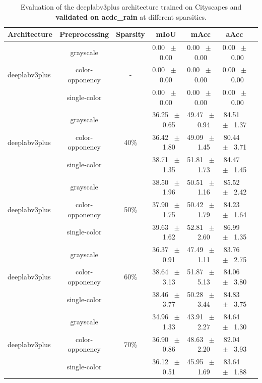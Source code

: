 \begin{table}[h]
  \centering
  \caption{Evaluation of the deeplabv3plus architecture trained on Cityscapes and \textbf{validated on acdc_rain} at different sparsities.}
  \begin{tabular}{@{}lccc ccc@{}}
    \toprule
    Architecture & Preprocessing & Sparsity & mIoU & mAcc & aAcc \\
    \midrule
    \midrule
    \midrule
    \multirow{3}{*}{deeplabv3plus} & grayscale & \multirow{3}{*}{-} & 0.00 ~$\pm$~ 0.00 & 0.00 ~$\pm$~ 0.00 & 0.00 ~$\pm$~ 0.00 \\
    & color-opponency & & 0.00 ~$\pm$~ 0.00 & 0.00 ~$\pm$~ 0.00 & 0.00 ~$\pm$~ 0.00 \\
    & single-color & & 0.00 ~$\pm$~ 0.00 & 0.00 ~$\pm$~ 0.00 & 0.00 ~$\pm$~ 0.00 \\
    \midrule
    \multirow{3}{*}{deeplabv3plus} & grayscale & \multirow{3}{*}{40\%} & 36.25 ~$\pm$~ 0.65 & 49.47 ~$\pm$~ 0.94 & 84.51 ~$\pm$~ 1.37 \\
    & color-opponency & & 36.42 ~$\pm$~ 1.80 & 49.09 ~$\pm$~ 1.45 & 80.44 ~$\pm$~ 3.71 \\
    & single-color & & 38.71 ~$\pm$~ 1.35 & 51.81 ~$\pm$~ 1.73 & 84.47 ~$\pm$~ 1.45 \\
    \midrule
    \multirow{3}{*}{deeplabv3plus} & grayscale & \multirow{3}{*}{50\%} & 38.50 ~$\pm$~ 1.96 & 50.51 ~$\pm$~ 1.16 & 85.52 ~$\pm$~ 2.42 \\
    & color-opponency & & 37.90 ~$\pm$~ 1.75 & 50.42 ~$\pm$~ 1.79 & 84.23 ~$\pm$~ 1.64 \\
    & single-color & & 39.63 ~$\pm$~ 1.62 & 52.81 ~$\pm$~ 2.60 & 86.99 ~$\pm$~ 1.35 \\
    \midrule
    \multirow{3}{*}{deeplabv3plus} & grayscale & \multirow{3}{*}{60\%} & 36.37 ~$\pm$~ 0.91 & 47.49 ~$\pm$~ 1.11 & 83.76 ~$\pm$~ 2.75 \\
    & color-opponency & & 38.64 ~$\pm$~ 3.13 & 51.87 ~$\pm$~ 5.13 & 84.06 ~$\pm$~ 3.80 \\
    & single-color & & 38.46 ~$\pm$~ 3.77 & 50.28 ~$\pm$~ 3.44 & 84.83 ~$\pm$~ 3.75 \\
    \midrule
    \multirow{3}{*}{deeplabv3plus} & grayscale & \multirow{3}{*}{70\%} & 34.96 ~$\pm$~ 1.33 & 43.91 ~$\pm$~ 2.27 & 84.64 ~$\pm$~ 1.30 \\
    & color-opponency & & 36.90 ~$\pm$~ 0.86 & 48.63 ~$\pm$~ 2.20 & 82.04 ~$\pm$~ 3.93 \\
    & single-color & & 36.12 ~$\pm$~ 0.51 & 45.95 ~$\pm$~ 1.69 & 83.64 ~$\pm$~ 1.88 \\

\end{tabular}
\end{table}
